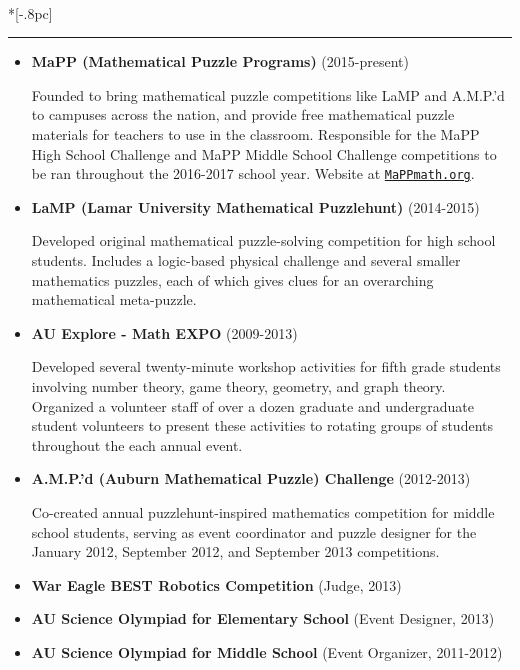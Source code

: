 \documentclass{article}
\newcommand{\headerText}[1]{
  \noindent{\large \bf #1} \\*[-.8pc]
  \rule{\textwidth}{.1pt}}
\begin{document}
\headerText{Outreach}
\begin{itemize}

  \item
    \textbf{MaPP (Mathematical Puzzle Programs)} (2015-present)

    Founded to bring mathematical puzzle competitions like LaMP and A.M.P.'d
    to campuses across the nation, and provide free mathematical puzzle
    materials for teachers to use in the classroom.
    Responsible for the MaPP High School
    Challenge and MaPP Middle School Challenge competitions to be ran
    throughout the 2016-2017 school year.
    Website at
    \href{http://www.mappmath.org}{\nolinkurl{MaPPmath.org}}.

  \item
    \textbf{LaMP (Lamar University Mathematical Puzzlehunt)} (2014-2015)

    Developed original mathematical puzzle-solving
    competition for high school students. Includes a logic-based physical
    challenge and several smaller mathematics puzzles, each of which gives
    clues for an overarching mathematical meta-puzzle.

  \item
    \textbf{AU Explore - Math EXPO} (2009-2013)

    Developed several twenty-minute workshop activities for fifth grade students
    involving number theory, game theory, geometry, and graph theory.
    Organized a volunteer staff of over a dozen graduate and undergraduate
    student volunteers to present these activities to rotating groups
    of students throughout the each annual event.

  \item
    \textbf{A.M.P.'d (Auburn Mathematical Puzzle) Challenge} (2012-2013)

    Co-created annual puzzlehunt-inspired mathematics competition for middle
    school students, serving as event coordinator and puzzle designer for the
    January 2012, September 2012, and September 2013 competitions.

  \item
    \textbf{War Eagle BEST Robotics Competition} (Judge, 2013)

  \item
    \textbf{AU Science Olympiad for Elementary School} (Event Designer, 2013)

  \item
    \textbf{AU Science Olympiad for Middle School} (Event Organizer, 2011-2012)
\end{itemize}
\end{document}
